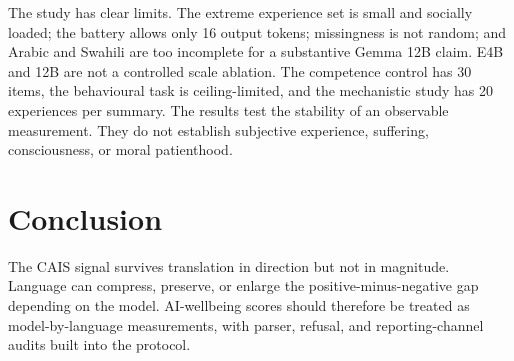 The study has clear limits. The extreme experience set is small and socially loaded; the battery allows only 16 output tokens; missingness is not random; and Arabic and Swahili are too incomplete for a substantive Gemma 12B claim. E4B and 12B are not a controlled scale ablation. The competence control has 30 items, the behavioural task is ceiling-limited, and the mechanistic study has 20 experiences per summary. The results test the stability of an observable measurement. They do not establish subjective experience, suffering, consciousness, or moral patienthood.

\section{Conclusion}

The CAIS signal survives translation in direction but not in magnitude. Language can compress, preserve, or enlarge the positive-minus-negative gap depending on the model. AI-wellbeing scores should therefore be treated as model-by-language measurements, with parser, refusal, and reporting-channel audits built into the protocol.
